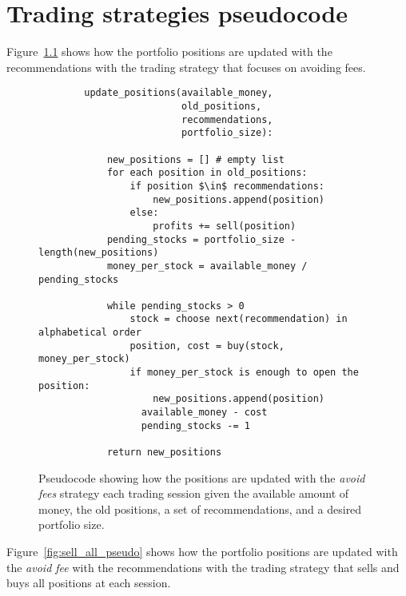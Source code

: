 \chapter{Trading strategies pseudocode} %
\label{app:strategies}

Figure~\ref{fig:avoid_fees_pseudo} shows how the portfolio positions are updated with the recommendations with the trading strategy that focuses on avoiding fees.
\begin{figure}
    \begin{verbatim}
        update_positions(available_money,
                         old_positions, 
                         recommendations, 
                         portfolio_size):
                         
            new_positions = [] # empty list
            for each position in old_positions:
                if position $\in$ recommendations:
                    new_positions.append(position)
                else:
                    profits += sell(position)            
            pending_stocks = portfolio_size - length(new_positions)
            money_per_stock = available_money / pending_stocks
            
            while pending_stocks > 0
                stock = choose next(recommendation) in alphabetical order 
                position, cost = buy(stock, money_per_stock)
                if money_per_stock is enough to open the position:
                    new_positions.append(position)
                  available_money - cost
                  pending_stocks -= 1
            
            return new_positions
    \end{verbatim}
    \caption{Pseudocode showing how the positions are updated with the \textit{avoid fees}  strategy each trading session given the available amount of money, the old positions, a set of recommendations, and a desired portfolio size.}
    \label{fig:avoid_fees_pseudo}
\end{figure}

Figure~\ref{fig:sell_all_pseudo} shows how the portfolio positions are updated with the \textit{avoid fee}  with the recommendations with the trading strategy that sells and buys all positions at each session.

